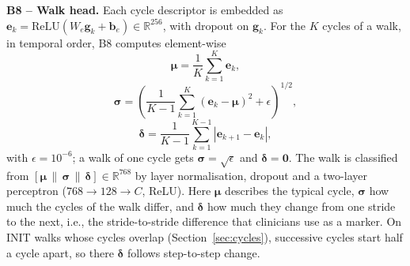 \documentclass[conference]{IEEEtran}
\begin{document}
\textbf{B8 -- Walk head.} Each cycle descriptor is embedded as $\mathbf{e}_k=\mathrm{ReLU}(W_e\mathbf{g}_k+\mathbf{b}_e)\in\mathbb{R}^{256}$, with dropout on $\mathbf{g}_k$. For the $K$ cycles of a walk, in temporal order, B8 computes element-wise
\begin{equation}
\boldsymbol{\mu}=\frac{1}{K}\sum_{k=1}^{K}\mathbf{e}_k,
\end{equation}
\begin{equation}
\boldsymbol{\sigma}=\left(\frac{1}{K-1}\sum_{k=1}^{K}(\mathbf{e}_k-\boldsymbol{\mu})^2+\epsilon\right)^{1/2},
\end{equation}
\begin{equation}
\boldsymbol{\delta}=\frac{1}{K-1}\sum_{k=1}^{K-1}\left|\mathbf{e}_{k+1}-\mathbf{e}_k\right|,
\label{eq:walk}
\end{equation}
with $\epsilon=10^{-6}$; a walk of one cycle gets $\boldsymbol{\sigma}=\sqrt{\epsilon}$ and $\boldsymbol{\delta}=\mathbf{0}$. The walk is classified from $[\boldsymbol{\mu}\,\|\,\boldsymbol{\sigma}\,\|\,\boldsymbol{\delta}]\in\mathbb{R}^{768}$ by layer normalisation, dropout and a two-layer perceptron ($768\to128\to C$, ReLU). Here $\boldsymbol{\mu}$ describes the typical cycle, $\boldsymbol{\sigma}$ how much the cycles of the walk differ, and $\boldsymbol{\delta}$ how much they change from one stride to the next, i.e., the stride-to-stride difference that clinicians use as a marker. On INIT walks whose cycles overlap (Section~\ref{sec:cycles}), successive cycles start half a cycle apart, so there $\boldsymbol{\delta}$ follows step-to-step change.
\end{document}
